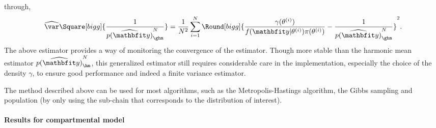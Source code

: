 through,
\begin{equation}
  \widehat{\var}\Square[bigg]{\frac{1}{\widehat{p(\data)}_{\ghm}^N}} =
  \frac{1}{N^2}\sum_{i=1}^N \Round[bigg]{
    \frac{\gamma(\theta^{(i)})}{f(\data|\theta^{(i)})\pi(\theta^{(i)})}
    - \frac{1}{\widehat{p(\data)}_{\ghm}^N}}^2.
\end{equation}
The above estimator provides a way of monitoring the convergence of the
estimator. Though more stable than the harmonic mean estimator
$\widehat{p(\data)}_{\hm}^N$, this generalized estimator still requires
considerable care in the implementation, especially the choice of the density
$\gamma$, to ensure good performance and indeed a finite variance estimator.

The method described above can be used for most \mcmc algorithms, such as the
Metropolis-Hastings algorithm, the Gibbs sampling and population \mcmc (by
only using the sub-chain that corresponds to the distribution of interest).

\paragraph{Results for \pet compartmental model}

